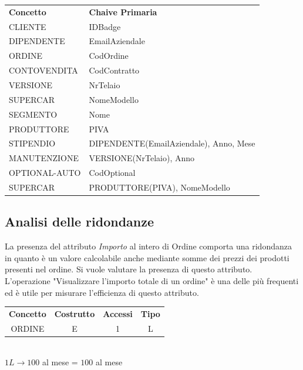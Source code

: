 \documentclass[11pt]{article}
\begin{document}
\begin{center}
    \begin{table}[htbp]
        \centering
        \small
        \begin{tabularx}{\textwidth}{l l}
            \rowcolor{red!20!}
            \textbf{Concetto} & \textbf{Chaive Primaria}\\
            CLIENTE & IDBadge \\
            DIPENDENTE & EmailAziendale \\
            ORDINE & CodOrdine \\
            CONTOVENDITA & CodContratto \\
            VERSIONE & NrTelaio \\
            SUPERCAR & NomeModello \\
            SEGMENTO & Nome \\
            PRODUTTORE & PIVA \\
            STIPENDIO & DIPENDENTE(EmailAziendale), Anno, Mese \\
            MANUTENZIONE & VERSIONE(NrTelaio), Anno \\
            OPTIONAL-AUTO & CodOptional \\
            SUPERCAR & PRODUTTORE(PIVA), NomeModello \\
        \end{tabularx}
    \end{table}    
\end{center}

\newpage

\subsection{Analisi delle ridondanze}

La presenza del attributo  \textit{Importo}  al intero di Ordine comporta una ridondanza 
in quanto è un valore calcolabile anche mediante somme dei prezzi dei prodotti presenti nel ordine. 
Si vuole valutare la presenza di questo attributo. \\

L'operazione "Visualizzare l'importo totale di un ordine" è una delle più
frequenti ed è utile per misurare l'efficienza di questo attributo.

\begin{table}[H]
    \centering
    \begin{tabular}{c c c c}
        \rowcolor{red!20!}
        \textbf{Concetto} & \textbf{Costrutto} & \textbf{Accessi} &
        \textbf{Tipo}\\
        ORDINE & E & 1 & L \\
    \end{tabular}\\
    \( 1L \rightarrow 100 \) al mese = \( 100 \) al mese
\end{table}
\end{document}
